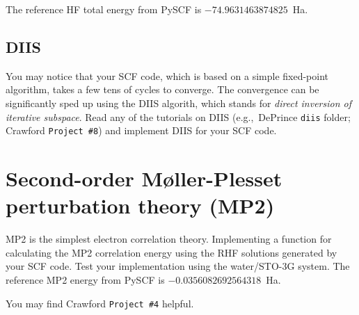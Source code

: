 \documentclass[parskip=full]{article}
\begin{document}
    The reference HF total energy from PySCF is $-74.9631463874825$~Ha.

    \subsection{DIIS}

    You may notice that your SCF code, which is based on a simple fixed-point algorithm, takes a few tens of cycles to converge.
    The convergence can be significantly sped up using the DIIS algorith, which stands for \textit{direct inversion of iterative subspace}.
    Read any of the tutorials on DIIS (e.g.,~DePrince \texttt{diis} folder; Crawford \texttt{Project \#8}) and implement DIIS for your SCF code.



    \section{Second-order Møller-Plesset perturbation theory (MP2)}

    MP2 is the simplest electron correlation theory.
    Implementing a function for calculating the MP2 correlation energy using the RHF solutions generated by your SCF code.
    Test your implementation using the water/STO-3G system.
    The reference MP2 energy from PySCF is $-0.0356082692564318$~Ha.

    You may find Crawford \texttt{Project \#4} helpful.




\end{document}
